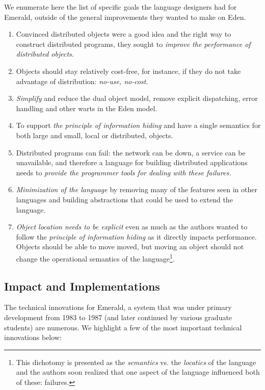 We enumerate here the list of specific goals the language designers had for Emerald, outside of the general improvements they wanted to make on Eden.
\begin{enumerate}
\item Convinced distributed objects were a good idea and the right way to construct distributed programs, they sought to \textit{improve the performance of distributed objects.}
\item Objects should stay relatively cost-free, for instance, if they do not take advantage of distribution: \textit{no-use, no-cost}.
\item \textit{Simplify} and reduce the dual object model, remove explicit dispatching, error handling and other warts in the Eden model.
\item To support \textit{the principle of information hiding} and have a single semantics for both large and small, local or distributed, objects.
\item Distributed programs can fail: the network can be down, a service can be unavailable, and therefore a language for building distributed applications needs to \textit{provide the programmer tools for dealing with these failures.}
\item \textit{Minimization of the language} by removing many of the features seen in other languages and building abstractions that could be used to extend the language.
\item \textit{Object location needs to be explicit} even as much as the authors wanted to follow the \textit{principle of information hiding} as it directly impacts performance.  Objects should be able to move moved, but moving an object should not change the operational semantics of the language\footnote{This dichotomy is presented as the \textit{semantics} vs. the \textit{locatics} of the language and the authors soon realized that one aspect of the language influenced both of these: failures.}.
\end{enumerate}

\subsection{Impact and Implementations}

The technical innovations for Emerald, a system that was under primary development from 1983 to 1987 (and later continued by various graduate students) are numerous.  We highlight a few of the most important technical innovations below:


